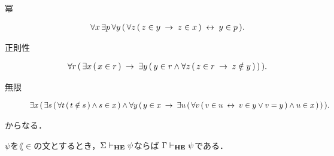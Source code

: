 \begin{description}
		\item[冪] 
			\begin{align}
				\forall x\, \exists p\, \forall y\, 
				(\, \forall z\, (\, z \in y \hspace{0.25em}\rightarrow\hspace{0.25em} z \in x\, ) \hspace{0.25em}\leftrightarrow\hspace{0.25em} y \in p\, ).
			\end{align}
			
		\item[正則性] 
			\begin{align}
				\forall r\, (\, \exists x\, (\, x \in r\, ) \hspace{0.25em}\rightarrow\hspace{0.25em}
				\exists y\, (\, y \in r \wedge \forall z\, (\, z \in r \hspace{0.25em}\rightarrow\hspace{0.25em}
				z \notin y\, )\, )\, ).
			\end{align}
			
		\item[無限] 
			\begin{align}
				\exists x\, (\, 
				\exists s\, (\, \forall t\, (\, t \notin s\, ) \wedge s \in x\, ) 
				\wedge \forall y\, (\, 
				y \in x \hspace{0.25em}\rightarrow\hspace{0.25em} \exists u\, (\, 
				\forall v\, (\, v \in u \hspace{0.25em}\leftrightarrow\hspace{0.25em} v \in y \vee v = y\, )
				\wedge u \in x\, )\, )\, ).
			\end{align}
	\end{description}
	からなる．
	
	
	\begin{screen}
		\begin{metathm}
		\label{metathm:Henkin_expansion_3}
			$\psi$を$\lang{\in}$の文とするとき，$\Sigma \vdash_{{\scriptsize \mbox{{\bf HE}}}} \psi$ならば
			$\Gamma \vdash_{{\scriptsize \mbox{{\bf HE}}}} \psi$である．
		\end{metathm}
	\end{screen}
	
